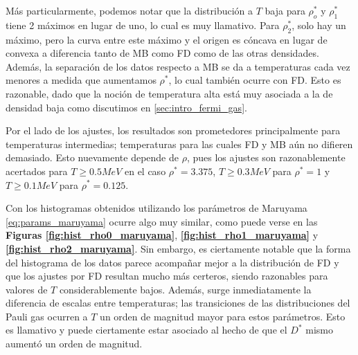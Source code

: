 Más particularmente, podemos notar que la distribución a $T$ baja para $\rho_o^*$ y $\rho_1^*$ tiene 2 máximos en lugar de uno, lo cual es muy llamativo.
Para $\rho_2^*$, solo hay un máximo, pero la curva entre este máximo y el origen es cóncava en lugar de convexa a diferencia tanto de MB como FD como de las otras densidades.
Además, la separación de los datos respecto a MB se da a temperaturas cada vez menores a medida que aumentamos $\rho^*$, lo cual también ocurre con FD.
Esto es razonable, dado que la noción de temperatura alta está muy asociada a la de densidad baja como discutimos en \ref{sec:intro_fermi_gas}.

Por el lado de los ajustes, los resultados son prometedores principalmente para temperaturas intermedias; temperaturas para las cuales FD y MB aún no difieren demasiado.
Esto nuevamente depende de $\rho$, pues los ajustes son razonablemente acertados para $T\geq 0.5MeV$ en el caso $\rho^*=3.375$, $T\geq 0.3MeV$ para $\rho^*=1$ y $T\geq 0.1MeV$ para $\rho^*=0.125$.

Con los histogramas obtenidos utilizando los parámetros de Maruyama \eqref{eq:params_maruyama} ocurre algo muy similar, como puede verse en las \textbf{Figuras \ref{fig:hist_rho0_maruyama}},
\textbf{\ref{fig:hist_rho1_maruyama}} y \textbf{\ref{fig:hist_rho2_maruyama}}.
Sin embargo, es ciertamente notable que la forma del histograma de los datos parece acompañar mejor a la distribución de FD y que los ajustes por FD resultan mucho más certeros, siendo
razonables para valores de $T$ considerablemente bajos.
Además, surge inmediatamente la diferencia de escalas entre temperaturas; las transiciones de las distribuciones del Pauli gas ocurren a $T$ un orden de magnitud mayor para estos parámetros.
Esto es llamativo y puede ciertamente estar asociado al hecho de que el $D^*$ mismo aumentó un orden de magnitud.

